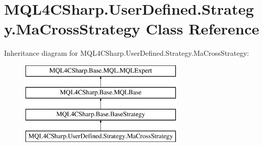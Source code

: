 \hypertarget{class_m_q_l4_c_sharp_1_1_user_defined_1_1_strategy_1_1_ma_cross_strategy}{}\section{M\+Q\+L4\+C\+Sharp.\+User\+Defined.\+Strategy.\+Ma\+Cross\+Strategy Class Reference}
\label{class_m_q_l4_c_sharp_1_1_user_defined_1_1_strategy_1_1_ma_cross_strategy}
Inheritance diagram for M\+Q\+L4\+C\+Sharp.\+User\+Defined.\+Strategy.\+Ma\+Cross\+Strategy\+:\begin{figure}[H]
\begin{center}
\leavevmode
\includegraphics[height=4.000000cm]{class_m_q_l4_c_sharp_1_1_user_defined_1_1_strategy_1_1_ma_cross_strategy}
\end{center}
\end{figure}
